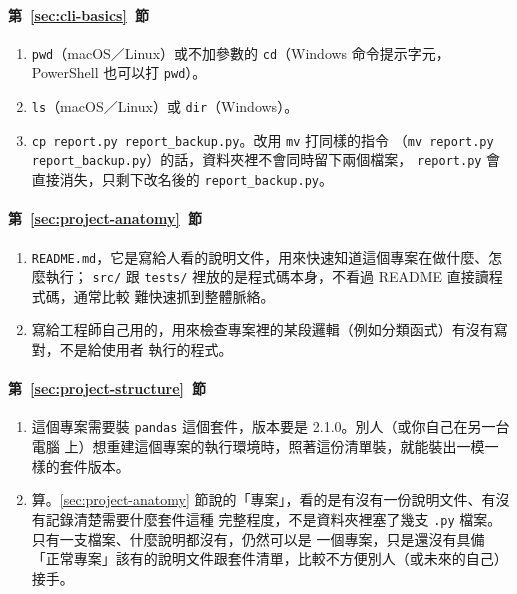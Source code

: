 \paragraph{第~\ref{sec:cli-basics}~節}
\begin{enumerate}
\item \texttt{pwd}（macOS／Linux）或不加參數的 \texttt{cd}（Windows 命令提示字元，
PowerShell 也可以打 \texttt{pwd}）。
\item \texttt{ls}（macOS／Linux）或 \texttt{dir}（Windows）。
\item \texttt{cp report.py report\_backup.py}。改用 \texttt{mv} 打同樣的指令
（\texttt{mv report.py report\_backup.py}）的話，資料夾裡不會同時留下兩個檔案，
\texttt{report.py} 會直接消失，只剩下改名後的 \texttt{report\_backup.py}。
\end{enumerate}

\paragraph{第~\ref{sec:project-anatomy}~節}
\begin{enumerate}
\item \texttt{README.md}，它是寫給人看的說明文件，用來快速知道這個專案在做什麼、怎麼執行；
\texttt{src/} 跟 \texttt{tests/} 裡放的是程式碼本身，不看過 README 直接讀程式碼，通常比較
難快速抓到整體脈絡。
\item 寫給工程師自己用的，用來檢查專案裡的某段邏輯（例如分類函式）有沒有寫對，不是給使用者
執行的程式。
\end{enumerate}

\paragraph{第~\ref{sec:project-structure}~節}
\begin{enumerate}
\item 這個專案需要裝 \texttt{pandas} 這個套件，版本要是 2.1.0。別人（或你自己在另一台電腦
上）想重建這個專案的執行環境時，照著這份清單裝，就能裝出一模一樣的套件版本。
\item 算。\ref{sec:project-anatomy} 節說的「專案」，看的是有沒有一份說明文件、有沒有記錄清楚需要什麼套件這種
完整程度，不是資料夾裡塞了幾支 \texttt{.py} 檔案。只有一支檔案、什麼說明都沒有，仍然可以是
一個專案，只是還沒有具備「正常專案」該有的說明文件跟套件清單，比較不方便別人（或未來的自己）
接手。
\end{enumerate}

